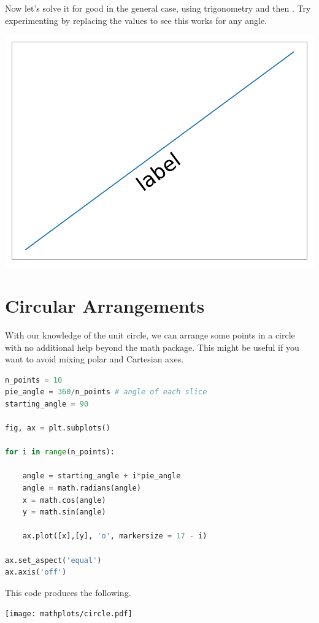 Now let's solve it for good in the general case, using trigonometry and then . Try experimenting by replacing the  values to see this works for any angle.  


\begin{center}
    \includegraphics[width = .6\textwidth]{figures/mathplots/slope-label.pdf}
\end{center}

\section{Circular Arrangements}\label{sec:circarrange}

With our knowledge of the unit circle, we can arrange some points in a circle with no additional help beyond the math package. This might be useful if you want to avoid mixing polar and Cartesian axes. 
\begin{lstlisting}[language = Python]
n_points = 10
pie_angle = 360/n_points # angle of each slice
starting_angle = 90

fig, ax = plt.subplots()

for i in range(n_points):
    
    angle = starting_angle + i*pie_angle
    angle = math.radians(angle)
    x = math.cos(angle) 
    y = math.sin(angle)
        
    ax.plot([x],[y], 'o', markersize = 17 - i)
    
ax.set_aspect('equal')
ax.axis('off')
\end{lstlisting}

This code produces the following.

\begin{center}
    \texttt{[image: mathplots/circle.pdf]}
\end{center}


